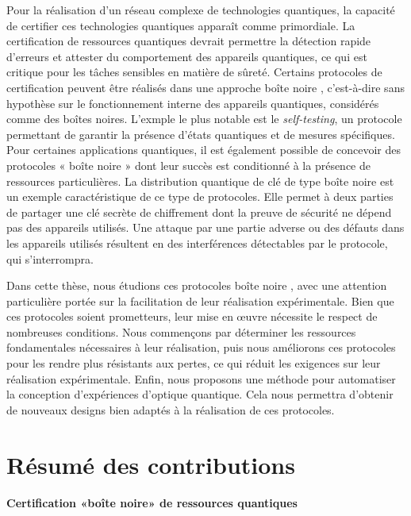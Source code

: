 \medbreak

Pour la réalisation d'un réseau complexe de technologies quantiques, la capacité de certifier ces technologies quantiques apparaît comme primordiale. 
La certification de ressources quantiques devrait permettre la détection rapide d'erreurs et attester du comportement des appareils quantiques, ce qui est critique pour les tâches sensibles en matière de sûreté.
Certains protocoles de certification peuvent être réalisés dans une approche \guillemotleft boîte noire \guillemotright, c'est-à-dire sans hypothèse sur le fonctionnement interne des appareils quantiques, considérés comme des boîtes noires. 
L'exmple le plus notable est le \textit{self-testing}, un protocole permettant de garantir la présence d'états quantiques et de mesures spécifiques.
Pour certaines applications quantiques, il est également possible de concevoir des protocoles « boîte noire » dont leur succès est conditionné à la présence de ressources particulières.
La distribution quantique de clé de type \guillemotleft boîte noire \guillemotright est un exemple caractéristique de ce type de protocoles. Elle permet à deux parties de partager une clé secrète de chiffrement dont la preuve de sécurité ne dépend pas des appareils utilisés. 
Une attaque par une partie adverse ou des défauts dans les appareils utilisés résultent en des interférences détectables par le protocole, qui s'interrompra.

\medbreak

Dans cette thèse, nous étudions ces protocoles \guillemotleft boîte noire \guillemotright, avec une attention particulière portée sur la facilitation de leur réalisation expérimentale.
Bien que ces protocoles soient prometteurs, leur mise en œuvre nécessite le respect de nombreuses conditions. 
Nous commençons par déterminer les ressources fondamentales nécessaires à leur réalisation, puis nous améliorons ces protocoles pour les rendre plus résistants aux pertes, ce qui réduit les exigences sur leur réalisation expérimentale. 
Enfin, nous proposons une méthode pour automatiser la conception d'expériences d'optique quantique. 
Cela nous permettra d'obtenir de nouveaux designs bien adaptés à la réalisation de ces protocoles.


\section{Résumé des contributions}

\paragraph{Certification «boîte noire» de ressources quantiques} 

